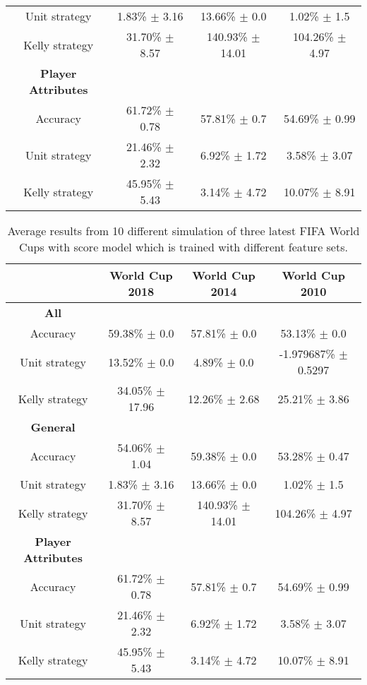 \begin{table}
\begin{tabular}{ | c |c| c | c |}
    Unit strategy & 1.83\% $\pm$ 3.16 & 13.66\% $\pm$ 0.0 & 1.02\% $\pm$ 1.5 \\
    Kelly strategy & 31.70\% $\pm$ 8.57 & 140.93\% $\pm$ 14.01 & 104.26\% $\pm$ 4.97 \\
    \hline
    \textbf{Player Attributes} \\
    \hline
    Accuracy & 61.72\% $\pm$ 0.78 & 57.81\% $\pm$ 0.7 & 54.69\% $\pm$ 0.99 \\
    Unit strategy & 21.46\% $\pm$ 2.32 & 6.92\% $\pm$ 1.72 & 3.58\% $\pm$ 3.07 \\
    Kelly strategy & 45.95\% $\pm$ 5.43 & 3.14\% $\pm$ 4.72 & 10.07\% $\pm$ 8.91 \\
    \hline
   \end{tabular}
\end{table}

\begin{table}
    \caption{Average results from 10 different simulation of three latest FIFA World Cups with score model which is trained with different feature sets.}
    \begin{tabular}{ | c |c| c | c |}
    \hline
    & World Cup 2018 & World Cup 2014 & World Cup 2010 \\
    \hline
    \textbf{All} \\
    \hline
    Accuracy & 59.38\% $\pm$ 0.0 & 57.81\% $\pm$ 0.0 & 53.13\% $\pm$ 0.0 \\
    Unit strategy & 13.52\% $\pm$ 0.0 & 4.89\%  $\pm$ 0.0 & -1.979687\% $\pm$ 0.5297 \\
    Kelly strategy & 34.05\% $\pm$ 17.96 & 12.26\% $\pm$ 2.68 & 25.21\% $\pm$ 3.86 \\
    \hline
    \textbf{General} \\
    \hline
    Accuracy & 54.06\% $\pm$ 1.04 & 59.38\% $\pm$ 0.0 & 53.28\% $\pm$ 0.47 \\
    Unit strategy & 1.83\% $\pm$ 3.16 & 13.66\% $\pm$ 0.0 & 1.02\% $\pm$ 1.5 \\
    Kelly strategy & 31.70\% $\pm$ 8.57 & 140.93\% $\pm$ 14.01 & 104.26\% $\pm$ 4.97 \\
    \hline
    \textbf{Player Attributes} \\
    \hline
    Accuracy & 61.72\% $\pm$ 0.78 & 57.81\% $\pm$ 0.7 & 54.69\% $\pm$ 0.99 \\
    Unit strategy & 21.46\% $\pm$ 2.32 & 6.92\% $\pm$ 1.72 & 3.58\% $\pm$ 3.07 \\
    Kelly strategy & 45.95\% $\pm$ 5.43 & 3.14\% $\pm$ 4.72 & 10.07\% $\pm$ 8.91 \\
    \hline
   \end{tabular}
\end{table}

